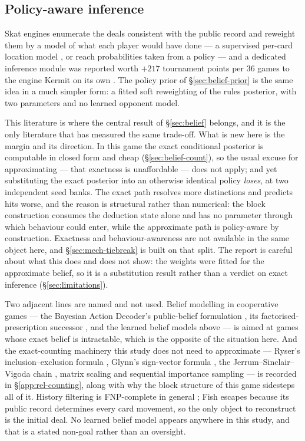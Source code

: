 \subsection{Policy-aware inference}
\label{sec:related-inference}

Skat engines enumerate the deals consistent with the public record and reweight
them by a model of what each player would have done --- a supervised per-card
location model \cite{solinas-supervised}, or reach probabilities taken from a
policy \cite{rebstock-inference} --- and a dedicated inference module was
reported worth $+217$ tournament points per 36 games to the engine Kermit on its
own \cite{buro-kermit}. The policy prior of \S\ref{sec:belief-prior} is the same
idea in a much simpler form: a fitted soft reweighting of the rules posterior,
with two parameters and no learned opponent model.

This literature is where the central result of \S\ref{sec:belief} belongs, and
it is the only literature that has measured the same trade-off. What is new here
is the margin and its direction. In this game the exact conditional posterior is
computable in closed form and cheap (\S\ref{sec:belief-count}), so the usual
excuse for approximating --- that exactness is unaffordable --- does not apply;
and yet substituting the exact posterior into an otherwise identical policy
\emph{loses}, at two independent seed banks. The exact path resolves more
distinctions and predicts hits worse, and the reason is structural rather than
numerical: the block construction consumes the deduction state alone and has no
parameter through which behaviour could enter, while the approximate path is
policy-aware by construction. Exactness and behaviour-awareness are not
available in the same object here, and \S\ref{sec:mech-tiebreak} is built on
that split. The report is careful about what this does and does not show: the
weights were fitted for the approximate belief, so it is a substitution result
rather than a verdict on exact inference (\S\ref{sec:limitations}).

Two adjacent lines are named and not used. Belief modelling in cooperative games
--- the Bayesian Action Decoder's public-belief formulation
\cite{foerster2019bad}, its factorised-prescription successor
\cite{sokota2021capi}, and the learned belief models above --- is aimed at games
whose exact belief is intractable, which is the opposite of the situation here.
And the exact-counting machinery this study does not need to approximate ---
Ryser's inclusion--exclusion formula \cite{ryser}, Glynn's sign-vector formula
\cite{glynn}, the Jerrum--Sinclair--Vigoda chain \cite{jsv}, matrix scaling
\cite{lsw} and sequential importance sampling \cite{chen-sis} --- is recorded in
\S\ref{app:rel-counting}, along with why the block structure of this game
sidesteps all of it. History filtering is FNP-complete in general
\cite{solinas-history}; Fish escapes because its public record determines every
card movement, so the only object to reconstruct is the initial deal. No learned
belief model appears anywhere in this study, and that is a stated non-goal
rather than an oversight.

